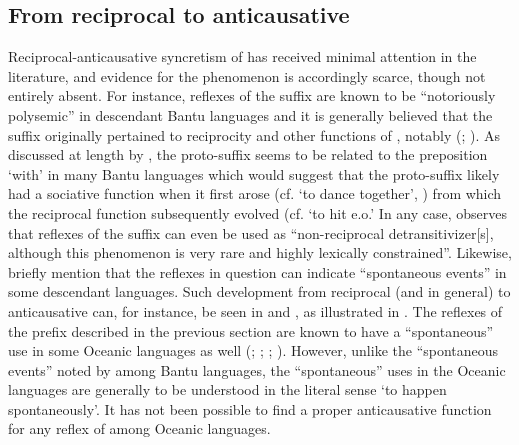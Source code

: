 \subsection{From reciprocal to anticausative} \label{diachrony:recp2antc}
Reciprocal-anticausative syncretism of  has received minimal attention in the literature, and evidence for the phenomenon is accordingly scarce, though not entirely absent. For instance, reflexes of the  suffix  are known to be “notoriously polysemic” in descendant Bantu languages \citep[732]{bostoen:al:2015} and it is generally believed that the suffix originally pertained to reciprocity and other functions of , notably  (\citealt[76]{schadeberg:2003}; \citealt[137ff.]{dom:al:2016}). As discussed at length by \citet{maslova:2000}, the proto-suffix seems to be related to the preposition  ‘with’ in many Bantu languages which would suggest that the proto-suffix  likely had a sociative function when it first arose (cf.   ‘to dance together’, \citealt[273, 277]{ndayiragije:2006}) from which the reciprocal function subsequently evolved (cf.   ‘to hit e.o.’ In any case, \citet[345]{maslova:2007} observes that reflexes of the suffix  can even be used as “non-reciprocal detransitivizer[s], although this phenomenon is very rare and highly lexically constrained”. Likewise, \citet[139]{dom:al:2016} briefly mention that the reflexes in question can indicate “spontaneous events” in some descendant languages. Such development from reciprocal (and  in general) to anticausative can, for instance, be seen in  \citep[209f.]{schaub:1985} and  \citep[191]{ambouroue:2007}, as illustrated in . The reflexes of the  prefix  described in the previous section are known to have a “spontaneous” use in some Oceanic languages as well (\citealt[48]{lichtenberk:2000}; \citealt[32, 51]{bril:2005}; \citealt[109]{moyse-faurie:2008}; \citeyear[109]{moyse-faurie:2017}). However, unlike the “spontaneous events” noted by \citet{dom:al:2016} among Bantu languages, the “spontaneous” uses in the Oceanic languages are generally to be understood in the literal sense ‘to happen spontaneously’. It has not been possible to find a proper anticausative function for any reflex of  among Oceanic languages.

